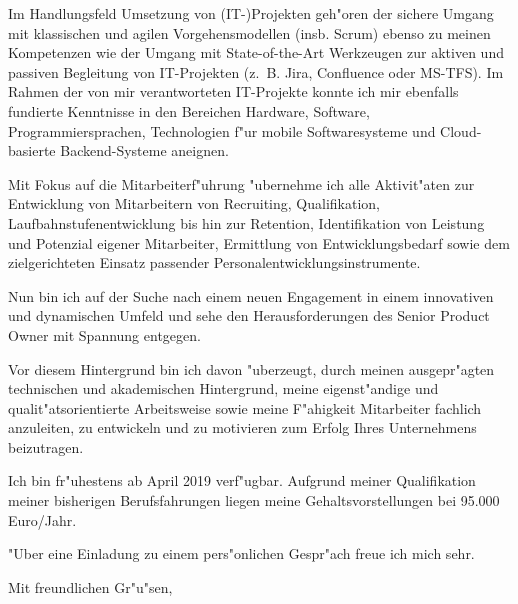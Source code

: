 \documentclass[10pt,a4paper]{dinbrief}
\begin{document}
\begin{letter}
Im Handlungsfeld Umsetzung von (IT-)Projekten geh"oren der sichere Umgang mit klassischen und agilen Vorgehensmodellen (insb. Scrum) ebenso zu meinen Kompetenzen wie der Umgang mit State-of-the-Art Werkzeugen zur aktiven und passiven Begleitung von IT-Projekten (z.~B. Jira, Confluence oder MS-TFS). Im Rahmen der von mir verantworteten IT-Projekte konnte ich mir ebenfalls fundierte Kenntnisse in den Bereichen Hardware, Software, Programmiersprachen, Technologien f"ur mobile Softwaresysteme und Cloud-basierte Backend-Systeme aneignen. 

Mit Fokus auf die Mitarbeiterf"uhrung "ubernehme ich alle Aktivit"aten zur Entwicklung von Mitarbeitern von Recruiting, Qualifikation, Laufbahnstufenentwicklung bis hin zur Retention, Identifikation von Leistung und Potenzial eigener Mitarbeiter, Ermittlung von Entwicklungsbedarf sowie dem zielgerichteten Einsatz passender Personalentwicklungsinstrumente.

Nun bin ich auf der Suche nach einem neuen Engagement in einem innovativen und dynamischen Umfeld und sehe den Herausforderungen des Senior Product Owner mit Spannung entgegen.

Vor diesem Hintergrund bin ich davon "uberzeugt, durch meinen ausgepr"agten technischen und akademischen Hintergrund, meine eigenst"andige und qualit"atsorientierte Arbeitsweise sowie meine F"ahigkeit Mitarbeiter fachlich anzuleiten, zu entwickeln und zu motivieren zum Erfolg Ihres Unternehmens beizutragen.

Ich bin fr"uhestens ab April 2019 verf"ugbar. Aufgrund meiner Qualifikation meiner bisherigen Berufsfahrungen liegen meine Gehaltsvorstellungen bei 95.000 Euro/Jahr. 

"Uber eine Einladung zu einem pers"onlichen Gespr"ach freue ich mich sehr.

\closing{Mit freundlichen Gr"u"sen,}
\end{letter}
\end{document}
